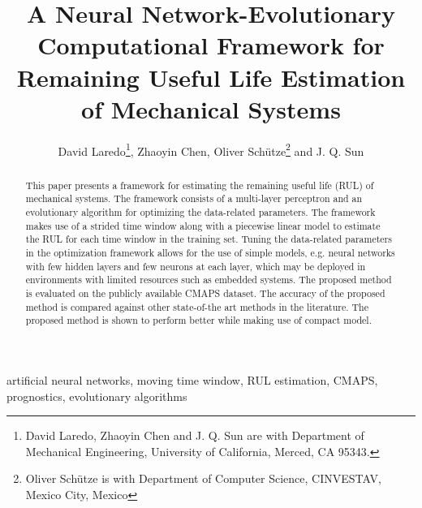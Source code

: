 
\title{A Neural Network-Evolutionary Computational Framework for Remaining Useful Life Estimation of Mechanical Systems}

\author{David Laredo\thanks{David Laredo, Zhaoyin Chen and J. Q. Sun are with Department of Mechanical Engineering, University of California, Merced, CA 95343.}, Zhaoyin Chen, Oliver Sch\"utze\thanks{Oliver Sch\"utze is with Department of Computer Science, CINVESTAV, Mexico City, Mexico} and J. Q. Sun}%


\maketitle

\begin{abstract}
This paper presents a framework for estimating the remaining useful life (RUL) of mechanical systems. The framework consists of a multi-layer perceptron and an evolutionary algorithm for optimizing the data-related parameters. The framework makes use of a strided time window along with a piecewise linear model to estimate the RUL for each time window in the training set. Tuning the data-related parameters in the optimization framework allows for the use of simple models, e.g. neural networks with few hidden layers and few neurons at each layer, which may be deployed in environments with limited resources such as embedded systems. The proposed method is evaluated on the publicly available CMAPS dataset. The accuracy of the proposed method is compared against other state-of-the art methods in the literature. The proposed method is shown to perform better while making use of compact model.
\end{abstract}


\begin{keywords}
artificial neural networks, moving time window, RUL estimation, CMAPS, prognostics, evolutionary algorithms
\end{keywords}

